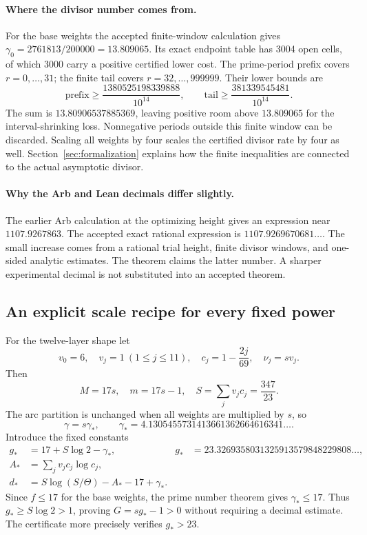 \paragraph{Where the divisor number comes from.}
For the base weights the accepted finite-window calculation gives
\(\gamma_0=2761813/200000=13.809065\). Its exact endpoint table
has 3004 open cells, of which 3000 carry a positive certified lower
cost. The prime-period prefix covers \(r=0,\ldots,31\); the finite
tail covers \(r=32,\ldots,999999\). Their lower bounds are
\[
\text{prefix}\ge\frac{1380525198339888}{10^{14}},\qquad
\text{tail}\ge\frac{381339545481}{10^{14}}.
\]
The sum is \(13.80906537885369\), leaving positive room above
\(13.809065\) for the interval-shrinking loss. Nonnegative periods
outside this finite window can be discarded. Scaling all weights
by four scales the certified divisor rate by four as well.
Section~\ref{sec:formalization} explains how the finite inequalities
are connected to the actual asymptotic divisor.

\paragraph{Why the Arb and Lean decimals differ slightly.}
The earlier Arb calculation at the optimizing height gives an
expression near \(1107.9267863\). The accepted exact rational
expression is \(1107.9269670681\ldots\). The small increase comes
from a rational trial height, finite divisor windows, and one-sided
analytic estimates. The theorem claims the latter number. A sharper
experimental decimal is not substituted into an accepted theorem.

\subsection{An explicit scale recipe for every fixed power}

For the twelve-layer shape let
\[
v_0=6,\quad v_j=1\ (1\le j\le11),\quad
c_j=1-\frac{2j}{69},\quad \nu_j=sv_j.
\]
Then
\[
M=17s,\quad m=17s-1,\quad
S=\sum_jv_jc_j=\frac{347}{23}.
\]
The arc partition is unchanged when all weights are multiplied by
\(s\), so
\[
\gamma=s\gamma_*,\qquad
\gamma_*=4.1305455731413661362664616341\ldots.
\]
Introduce the fixed constants
\begin{align}
g_*&=17+S\log2-\gamma_*,
 &g_*&=23.3269358031325913579848229808\ldots,\label{eq:gstar}\\
A_*&=\sum_jv_jc_j\log c_j,\nonumber\\
d_*&=S\log(S/\Theta)-A_*-17+\gamma_*.\label{eq:dstar}
\end{align}
Since \(f\le17\) for the base weights, the prime number theorem gives
\(\gamma_*\le17\). Thus \(g_*\ge S\log2>1\), proving
\(G=sg_*-1>0\) without requiring a decimal estimate.
The certificate more precisely verifies \(g_*>23\).

